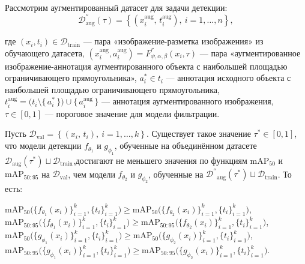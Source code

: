 Рассмотрим аугментированный датасет для задачи детекции:
\[
\mathcal{D}^{''}_{\text{aug}}(\tau) =
\left\{
  (x_i^{\text{aug}},\,t_i^{\text{aug}}), \
  i = 1,\dots,n
\right\},
\]

где $(x_i, t_i) \in \mathcal{D}_{\mathrm{train}}$ — пара «изображение-разметка изображения» из обучающего датасета,
$(x_i^{\mathrm{aug}}, a_i^{\mathrm{aug}}) = F^{''}_{\psi,\alpha,\beta}(x_i, \tau)$ — пара «аугментированное изображение-аннотация аугментированного объекта с наибольшей площадью ограничивающего прямоугольника»,
$a_i^* \in t_i$ — аннотация исходного объекта с наибольшей площадью ограничивающего прямоугольника,
$t_i^{\mathrm{aug}} = \bigl(t_i \setminus \{\,a_i^*\,\}\bigr) \cup \{\,a_i^{\mathrm{aug}}\,\}$ — аннотация аугментированного изображения,
$\tau \in [0,1]$ — пороговое значение для модели фильтрации.
\begin{statement3}
Пусть $\mathcal{D}_{\text{val}} =
\left\{
  (x_i,\,t_i), \
  i = 1,\dots,k
\right\}$. Существует такое значение $\tau^*\in[0,1]$, что модели детекции $f_{\theta_1}$ и $g_{\phi_1}$, обученные на объединённом датасете $\mathcal{D}_{\mathrm{aug}}(\tau^*)\sqcup\mathcal{D}_{\mathrm{train}}$,достигают не меньшего значения по функциям $\mathrm{mAP}_{50}$ и $\mathrm{mAP}_{50:95}$ на $\mathcal{D}_{\text{val}}$, чем модели $f_{\theta_2}$ и $g_{\phi_2}$, обученные на $\mathcal{D^{''}}_{\text{aug}}(\tau^{*}) \sqcup \mathcal{D}_{\text{train}}$. То есть:
\begin{center}
$\mathrm{mAP}_{50}\bigl(\{f_{\theta_1}(x_i)\}_{i=1}^k,\{t_i\}_{i=1}^k\bigr)\ge\mathrm{mAP}_{50}\bigl(\{f_{\theta_2}(x_i)\}_{i=1}^k,\{t_i\}_{i=1}^k\bigr)$,  
$\mathrm{mAP}_{50:95}\bigl(\{f_{\theta_1}(x_i)\}_{i=1}^k,\{t_i\}_{i=1}^k\bigr)\ge\mathrm{mAP}_{50:95}\bigl(\{f_{\theta_2}(x_i)\}_{i=1}^k,\{t_i\}_{i=1}^k\bigr)$,  
$\mathrm{mAP}_{50}\bigl(\{g_{\phi_1}(x_i)\}_{i=1}^k,\{t_i\}_{i=1}^k\bigr)\ge\mathrm{mAP}_{50}\bigl(\{g_{\phi_2}(x_i)\}_{i=1}^k,\{t_i\}_{i=1}^k\bigr)$,  
$\mathrm{mAP}_{50:95}\bigl(\{g_{\phi_1}(x_i)\}_{i=1}^k,\{t_i\}_{i=1}^k\bigr)\ge\mathrm{mAP}_{50:95}\bigl(\{g_{\phi_2}(x_i)\}_{i=1}^k,\{t_i\}_{i=1}^k\bigr)$.
\end{center}
\
\end{statement3}





